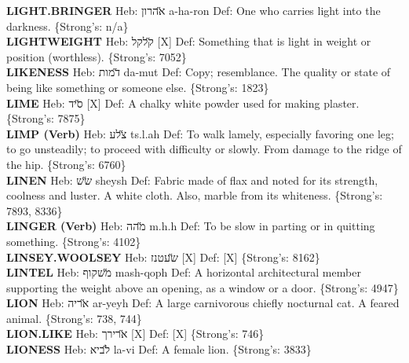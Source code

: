{\textbf{LIGHT.BRINGER} Heb: {\large\H אהרון} a-ha-ron Def: One who carries light into the darkness. \{Strong's: n/a\}\hfill{}\\

\textbf{LIGHTWEIGHT} Heb: {\large\H קלקל} {[}X{]} Def: Something that is light in weight or position (worthless). \{Strong's: 7052\}\hfill{}\\

\textbf{LIKENESS} Heb: {\large\H דמות} da-mut Def: Copy; resemblance. The quality or state of being like something or someone else. \{Strong's: 1823\}\hfill{}\\

\textbf{LIME} Heb: {\large\H סיד} {[}X{]} Def: A chalky white powder used for making plaster. \{Strong's: 7875\}\hfill{}\\

\textbf{LIMP (Verb)} Heb: {\large\H צלע} ts.l.ah Def: To walk lamely, especially favoring one leg; to go unsteadily; to proceed with difficulty or slowly. From damage to the ridge of the hip. \{Strong's: 6760\}\hfill{}\\

\textbf{LINEN} Heb: {\large\H שש} sheysh Def: Fabric made of flax and noted for its strength, coolness and luster. A white cloth. Also, marble from its whiteness. \{Strong's: 7893, 8336\}\hfill{}\\

\textbf{LINGER (Verb)} Heb: {\large\H מהה} m.h.h Def: To be slow in parting or in quitting something. \{Strong's: 4102\}\hfill{}\\

\textbf{LINSEY.WOOLSEY} Heb: {\large\H שעטנז} {[}X{]} Def: {[}X{]} \{Strong's: 8162\}\hfill{}\\

\textbf{LINTEL} Heb: {\large\H משקוף} mash-qoph Def: A horizontal architectural member supporting the weight above an opening, as a window or a door. \{Strong's: 4947\}\hfill{}\\

\textbf{LION} Heb: {\large\H אריה} ar-yeyh Def: A large carnivorous chiefly nocturnal cat. A feared animal. \{Strong's: 738, 744\}\hfill{}\\

\textbf{LION.LIKE} Heb: {\large\H ארירך} {[}X{]} Def: {[}X{]} \{Strong's: 746\}\hfill{}\\

\textbf{LIONESS} Heb: {\large\H לביא} la-vi Def: A female lion. \{Strong's: 3833\}\hfill{}\\

}
